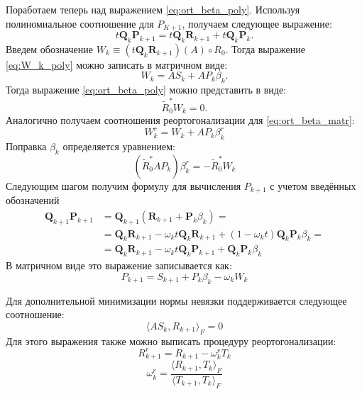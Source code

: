 Поработаем теперь над выражением \eqref{eq:ort_beta_poly}. Используя полиномиальное соотношение для 
$P_{K+1}$, получаем следующее выражение:
\begin{equation}
    \label{eq:W_k_poly}
    t\mathbf{Q}_k\mathbf{P}_{k+1} = t\mathbf{Q}_k\mathbf{R}_{k+1} + t\mathbf{Q}_k\mathbf{P}_k.
\end{equation}
Введем обозначение $W_k \equiv (t \mathbf{Q}_k \mathbf{R}_{k+1} )(A) \circ R_0$. 
Тогда выражение \eqref{eq:W_k_poly} можно записать в матричном виде:
\begin{equation}
    \label{eq:W_k_matr}
    W_k = AS_k + AP_k\beta_k.
\end{equation}
Тогда выражение \eqref{eq:ort_beta_poly} можно представить в виде: 
\begin{equation}
    \label{eq:ort_beta_matr}
    \tilde{R}_0^*W_k = 0.
\end{equation}
Аналогично получаем соотношения реортогонализации для \eqref{eq:ort_beta_matr}:
\begin{equation*}
    W_k^r = W_k + AP_k\beta_k^r
\end{equation*}
Поправка $\beta_k$ определяется уравнением:
\begin{equation*}
    (\tilde{R}_0^*AP_k)\beta_k^r = -\tilde{R}_0^*W_k
\end{equation*}
Следующим шагом получим формулу для вычисления $P_{k+1}$ с учетом введённых обозначений
\begin{align*}
    \mathbf{Q}_{k+1}\mathbf{P}_{k+1} &= \mathbf{Q}_{k+1}(\mathbf{R}_{k+1} + \mathbf{P}_{k}\beta_k) = \\
                                     &= \mathbf{Q}_{k}\mathbf{R}_{k+1} - \omega_kt\mathbf{Q}_{k}\mathbf{R}_{k+1} + (1-\omega_kt)\mathbf{Q}_{k}\mathbf{P}_{k}\beta_k = \\
                                     &= \mathbf{Q}_{k} \mathbf{R}_{k+1} - \omega_kt\mathbf{Q}_{k}\mathbf{P}_{k+1} + \mathbf{Q}_{k} \mathbf{P}_{k} \beta_k
\end{align*}
В матричном виде это выражение записывается как:
\begin{equation*}
    P_{k+1} = S_{k+1} + P_k \beta_k - \omega_k W_k
\end{equation*}

Для дополнительной минимизации нормы невязки поддерживается следующее соотношение:
$$ \langle AS_k,R_{k+1}\rangle_F=0 $$
Для этого выражения также можно выписать процедуру реортогонализации:
\begin{equation*}
    R_{k+1}^r = R_{k+1} - \omega_k^r T_k
\end{equation*}
\begin{equation*}
    \omega_k^r = \frac{\langle R_{k+1}, T_k \rangle_F}{\langle T_{k+1}, T_k \rangle_F}
\end{equation*}

